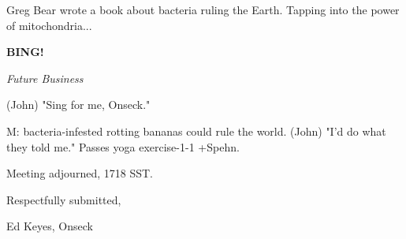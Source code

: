 \documentclass[12pt]{article}
\newcommand{\bing}{{\bf BING!} }
\newcommand{\goto}[1]{\bing \vskip 12pt \centerline{{\em{#1}}}}
\begin{document}
Greg Bear wrote a book about bacteria ruling the Earth. Tapping into the power of mitochondria...

\goto{Future Business}

(John) "Sing for me, Onseck."

M: bacteria-infested rotting bananas could rule the world. (John) "I'd do what they told me." Passes yoga exercise-1-1 +Spehn.

\vspace{12pt}

\noindent
Meeting adjourned, 1718 SST.

\vspace{18pt}

\centerline{Respectfully submitted,}
\centerline{Ed Keyes, Onseck}
\end{document}
